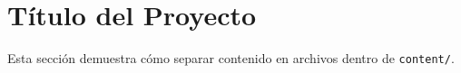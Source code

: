 \section*{Título del Proyecto}
Esta sección demuestra cómo separar contenido en archivos dentro de \texttt{content/}.

